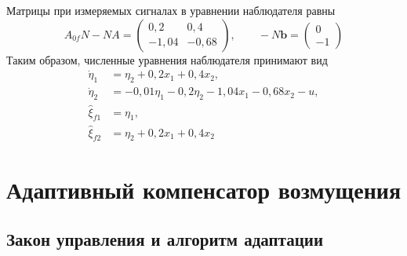 Матрицы при измеряемых сигналах в уравнении наблюдателя равны
\begin{equation}
  A_{0f}N-NA=
  \begin{pmatrix}0{,}2&0{,}4\\-1{,}04&-0{,}68\end{pmatrix},
  \qquad -N\bm b=\begin{pmatrix}0\\-1\end{pmatrix}
  \label{eq:observer-input-matrices}
\end{equation}
Таким образом, численные уравнения наблюдателя принимают вид
\begin{equation}
  \begin{aligned}
    \dot\eta_1&=\eta_2+0{,}2x_1+0{,}4x_2,\\
    \dot\eta_2&=-0{,}01\eta_1-0{,}2\eta_2-1{,}04x_1-0{,}68x_2-u,\\
    \hat\xi_{f1}&=\eta_1,\\
    \hat\xi_{f2}&=\eta_2+0{,}2x_1+0{,}4x_2
  \end{aligned}
  \label{eq:observer-numeric}
\end{equation}


\section{Адаптивный компенсатор возмущения}

\subsection{Закон управления и алгоритм адаптации}

